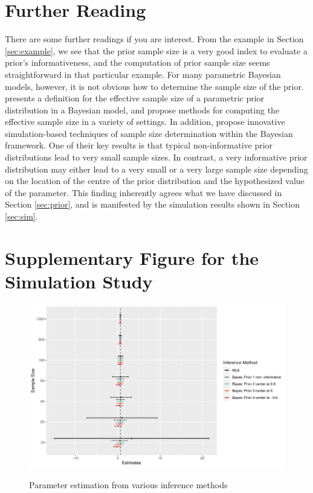 \documentclass{article}
\numberwithin{equation}{section}
\theoremstyle{plain}
\begin{document}
\section{Further Reading}
There are some further readings if you are interest. From the example in Section \ref{sec:example}, we see that the prior sample size is a very good index to evaluate a prior's informativeness, and the computation of prior sample size seems straightforward in that particular example. For many parametric Bayesian models, however, it is not obvious how to determine the sample size of the prior. \cite{Morita2008} presents a definition for the effective sample size of a parametric prior distribution in a Bayesian model, and propose methods for computing the effective sample size in a variety of settings. In addition, \cite{Sahu2006} propose innovative simulation-based techniques of sample size determination within the Bayesian framework. One of their key results is that typical non-informative prior distributions lead to very small sample sizes. In contrast, a very informative prior distribution may either lead to a very small or a very large sample size depending on the location of the centre of the prior distribution and the hypothesized value of the parameter. This finding inherently agrees what we have discussed in Section \ref{sec:prior}, and is manifested by the simulation results shown in Section \ref{sec:sim}.
 


\newpage
\appendix
\section{Supplementary Figure for the Simulation Study}
\label{app:suppfig}
\begin{figure}[H]
    \centering
    \caption{Parameter estimation from various inference methods}
    \includegraphics[scale=0.7]{figures/Estimates_full.pdf}
    \label{fig:estimate_full}
\end{figure}
 
\end{document}
